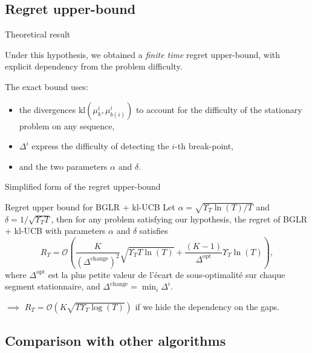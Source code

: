 \documentclass[11pt,english,ignorenonframetext,]{beamer}
\begin{document}
\subsection{\hfill{}Regret upper-bound\hfill{}}

\begin{frame}{Theoretical result}

  Under this hypothesis, we obtained a \emph{finite time}
  regret upper-bound, with explicit dependency from the problem difficulty.

  The exact bound uses:
  \begin{itemize}
    \item
    the divergences $\mathrm{kl}(\mu_{k}^{i},\mu_{b(i)}^{i})$ to account for the difficulty of the stationary problem on any sequence,
    \item
    $\Delta^{i}$ express the difficulty of detecting the $i$-th break-point,
    \item
    and the two parameters $\alpha$ and $\delta$.
  \end{itemize}

\end{frame}


\begin{frame}{Simplified form of the regret upper-bound}

  \begin{block}{Regret upper bound for BGLR + kl-UCB}
    Let $\alpha = \sqrt{\Upsilon_T \ln(T) / T}$ and $\delta = 1 / \sqrt{\Upsilon_T T}$,
    then for any problem satisfying our hypothesis,
    the regret of BGLR + kl-UCB with parameters $\alpha$ and $\delta$ satisfies
    \[ R_T =\mathcal{O}\left( \frac{K}{\left(\Delta^{\text{change}}\right)^2}\sqrt{\Upsilon_T T \ln(T)} + \frac{(K-1)}{\Delta^{\text{opt}}} \Upsilon_T\ln(T) \right),\]
    where $\Delta^{\text{opt}}$ est la plus petite valeur de l'écart de sous-optimalité sur chaque segment stationnaire,
    and $\Delta^{\text{change}} = \min_{i} \Delta^{i}$.
\end{block}

$\implies$ $R_T = \mathcal{O}(K \sqrt{T \Upsilon_T \log(T)})$ if we hide the dependency on the gaps.

\end{frame}


\subsection{\hfill{}Comparison with other algorithms\hfill{}}
\end{document}
